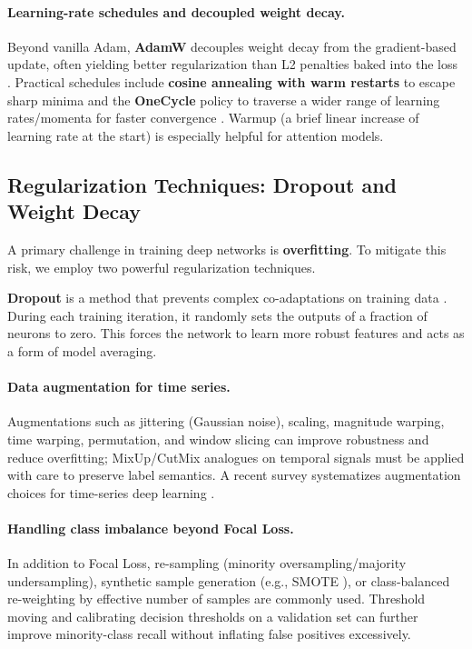 \paragraph{Learning-rate schedules and decoupled weight decay.} Beyond vanilla Adam, \textbf{AdamW} decouples weight decay from the gradient-based update, often yielding better regularization than L2 penalties baked into the loss \citep{loshchilov2019decoupled}. Practical schedules include \textbf{cosine annealing with warm restarts} to escape sharp minima \citep{loshchilov2016sgdr} and the \textbf{OneCycle} policy to traverse a wider range of learning rates/momenta for faster convergence \citep{smith2018superconvergence}. Warmup (a brief linear increase of learning rate at the start) is especially helpful for attention models.

\subsection{Regularization Techniques: Dropout and Weight Decay}
\label{sec:regularization}

A primary challenge in training deep networks is \textbf{overfitting}. To mitigate this risk, we employ two powerful regularization techniques.

\textbf{Dropout} is a method that prevents complex co-adaptations on training data \citep{srivastava2014dropout}. During each training iteration, it randomly sets the outputs of a fraction of neurons to zero. This forces the network to learn more robust features and acts as a form of model averaging.

\paragraph{Data augmentation for time series.} Augmentations such as jittering (Gaussian noise), scaling, magnitude warping, time warping, permutation, and window slicing can improve robustness and reduce overfitting; MixUp/CutMix analogues on temporal signals must be applied with care to preserve label semantics. A recent survey systematizes augmentation choices for time-series deep learning \citep{wen2021time}.

\paragraph{Handling class imbalance beyond Focal Loss.} In addition to Focal Loss, re-sampling (minority oversampling/majority undersampling), synthetic sample generation (e.g., SMOTE \citep{chawla2002smote}), or class-balanced re-weighting by effective number of samples are commonly used. Threshold moving and calibrating decision thresholds on a validation set can further improve minority-class recall without inflating false positives excessively.

